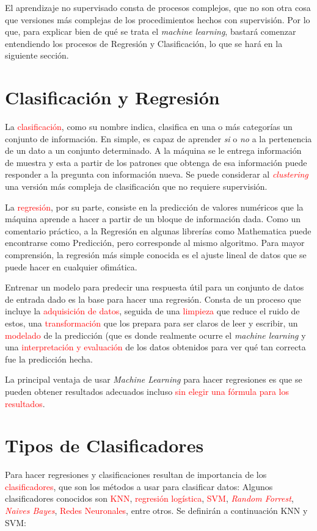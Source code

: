 \documentclass{book}
\begin{document}
El aprendizaje no supervisado consta de procesos complejos, que no son otra cosa que versiones más complejas de los procedimientos hechos con supervisión. Por lo que, para explicar bien de qué se trata el \textit{machine learning}, bastará comenzar entendiendo los procesos de Regresión y Clasificación, lo que se hará en la siguiente sección.

\section{Clasificación y Regresión}
La \textcolor{red}{clasificación}, como su nombre indica, clasifica en una o más categorías un conjunto de información. En simple, es capaz de aprender \textit{si} o \textit{no} a la pertenencia de un dato a un conjunto determinado. A la máquina se le entrega información de muestra y esta a partir de los patrones que obtenga de esa información puede responder a la pregunta con información nueva. Se puede considerar al \textcolor{red}{\textit{clustering}} una versión más compleja de clasificación que no requiere supervisión.

La \textcolor{red}{regresión}, por su parte, consiste en la predicción de valores numéricos que la máquina aprende a hacer a partir de un bloque de información dada. Como un comentario práctico, a la Regresión en algunas librerías como \textcolor{fgreen}{Mathematica} puede encontrarse como Predicción, pero corresponde al mismo algoritmo. Para mayor comprensión, la regresión más simple conocida es el ajuste lineal de datos que se puede hacer en cualquier ofimática.

Entrenar un modelo para predecir una respuesta útil para un conjunto de datos de entrada dado es la base para hacer una regresión. Consta de un proceso que incluye la \textcolor{red}{adquisición de datos}, seguida de una \textcolor{red}{limpieza} que reduce el ruido de estos, una  \textcolor{red}{transformación} que los prepara para ser claros de leer y escribir, un \textcolor{red}{modelado} de la predicción (que es donde realmente ocurre el \textit{machine learning} y una \textcolor{red}{interpretación y evaluación} de los datos obtenidos para ver qué tan correcta fue la predicción hecha.

La principal ventaja de usar \textit{Machine Learning} para hacer regresiones es que se pueden obtener resultados adecuados incluso \textcolor{red}{sin elegir una fórmula para los resultados}.

\section{Tipos de Clasificadores}
Para hacer regresiones y clasificaciones resultan de importancia de los \textcolor{red}{clasificadores}, que son los métodos a usar para clasificar datos: Algunos clasificadores conocidos son \textcolor{red}{KNN}, \textcolor{red}{regresión logística}, \textcolor{red}{SVM}, \textcolor{red}{\textit{Random Forrest}}, \textcolor{red}{\textit{Naives Bayes}}, \textcolor{red}{Redes Neuronales}, entre otros. Se definirán a continuación KNN y SVM:
\end{document}
